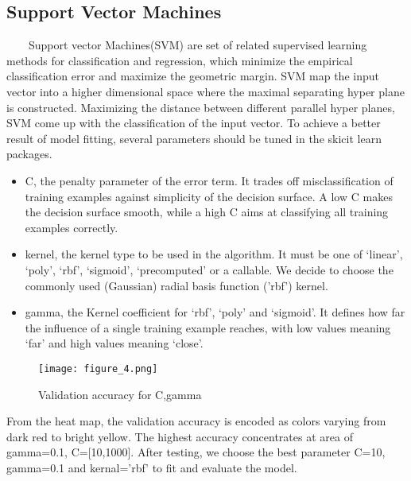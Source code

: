 \documentclass[11pt]{article}
\begin{document}
\subsection{Support Vector Machines}
\ \ \ \ Support vector Machines(SVM) are set of related supervised learning methods for classification and regression, which minimize the empirical classification error and maximize the geometric margin. SVM map the input vector into a higher dimensional space where the maximal separating hyper plane is constructed. Maximizing the distance between different parallel hyper planes, SVM come up with the classification of the input vector\cite{svm}. To achieve a better result of model fitting, several parameters should be tuned in the skicit learn packages. 
\begin{itemize}
\item C, the penalty parameter of the error term. It trades off misclassification of training examples against simplicity of the decision surface. A low C makes the decision surface smooth, while a high C aims at classifying all training examples correctly.
\item kernel, the kernel type to be used in the algorithm. It must be one of ‘linear’, ‘poly’, ‘rbf’, ‘sigmoid’, ‘precomputed’ or a callable. We decide to choose the commonly used (Gaussian) radial basis function ('rbf') kernel.
\item gamma, the Kernel coefficient for ‘rbf’, ‘poly’ and ‘sigmoid'. It defines how far the influence of a single training example reaches, with low values meaning ‘far’ and high values meaning ‘close’. 
\end{itemize}
\begin{multicols}{2}
	\begin{flushleft}
    \begin{figure}[H]
       \caption{Validation accuracy for C,gamma}
      \texttt{[image: figure\_4.png]}
      \end{figure}
    \end{flushleft}
  \begin{flushleft}
From the heat map, the validation accuracy is encoded as colors varying from dark red to bright yellow. The highest accuracy concentrates at area of gamma=0.1, C=[10,1000]. After testing, we choose the best parameter C=10, gamma=0.1 and kernal='rbf' to fit and evaluate the model. 
\end{flushleft}
\end{multicols}   
\end{document}
